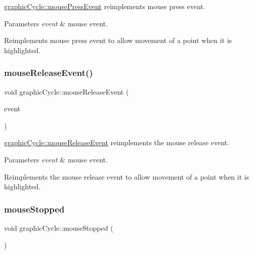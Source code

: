 \mbox{\hyperlink{classgraphic_cycle_af731c349d665b784291187ad4b0a71d9}{graphic\+Cycle\+::mouse\+Press\+Event}} reimplements mouse press event. 


\begin{DoxyParams}{Parameters}
{\em event} & mouse event.\\
\hline
\end{DoxyParams}
Reimplements mouse press event to allow movement of a point when it is highlighted. \mbox{\label{classgraphic_cycle_a10c7318e9cf6d79e0aad3eec5c1d697a}} 
\subsubsection{\texorpdfstring{mouse\+Release\+Event()}{mouseReleaseEvent()}}
{\footnotesize\ttfamily void graphic\+Cycle\+::mouse\+Release\+Event (\begin{DoxyParamCaption}\item[{Q\+Graphics\+Scene\+Mouse\+Event $\ast$}]{event }\end{DoxyParamCaption})}



\mbox{\hyperlink{classgraphic_cycle_a10c7318e9cf6d79e0aad3eec5c1d697a}{graphic\+Cycle\+::mouse\+Release\+Event}} reimplements the mouse release event. 


\begin{DoxyParams}{Parameters}
{\em event} & mouse event.\\
\hline
\end{DoxyParams}
Reimplements the mouse release event to allow movement of a point when it is highlighted. \mbox{\label{classgraphic_cycle_a173e5e3dfb0dde41c8046a53086e02ab}} 
\subsubsection{\texorpdfstring{mouse\+Stopped}{mouseStopped}}
{\footnotesize\ttfamily void graphic\+Cycle\+::mouse\+Stopped (\begin{DoxyParamCaption}{ }\end{DoxyParamCaption})\hspace{0.3cm}{\ttfamily [slot]}}



